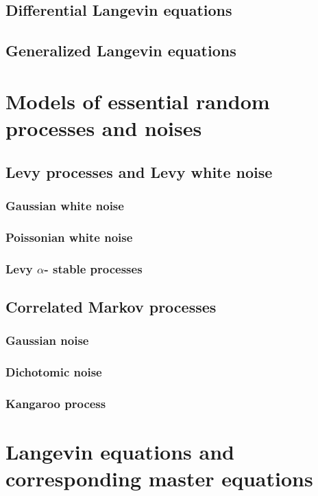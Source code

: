 \documentclass[authoryear,draft,1p,times]{elsarticle}
\renewcommand{\=}{\stackrel{\mathrm{d}}{=}}
\begin{document}
\subsection{Differential Langevin equations}
\subsection{Generalized Langevin equations}

\section{Models of essential random processes and noises}

\subsection{Levy processes and Levy white noise}
\subsubsection{Gaussian  white  noise}
\subsubsection{Poissonian white noise}
\subsubsection{Levy $\alpha$- stable processes} 
\subsection{Correlated  Markov processes} 
\subsubsection{Gaussian   noise}
\subsubsection{Dichotomic  noise}
\subsubsection{Kangaroo  process}

\section{Langevin equations and corresponding  master equations}
\end{document}
